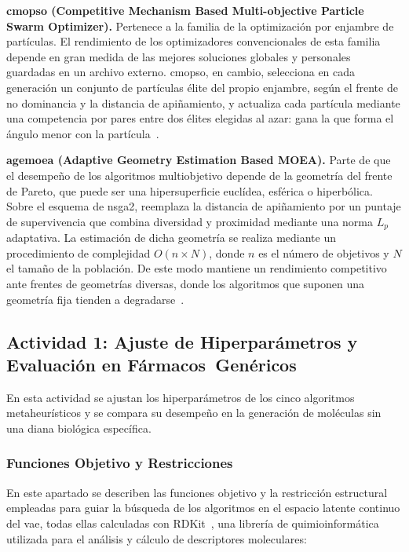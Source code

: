 \textbf{\acrshort{cmopso} (Competitive Mechanism Based Multi-objective Particle Swarm Optimizer).} Pertenece a la familia de la optimización por enjambre de partículas. El rendimiento de los optimizadores convencionales de esta familia depende en gran medida de las mejores soluciones globales y personales guardadas en un archivo externo. \acrshort{cmopso}, en cambio, selecciona en cada generación un conjunto de partículas élite del propio enjambre, según el frente de no dominancia y la distancia de apiñamiento, y actualiza cada partícula mediante una competencia por pares entre dos élites elegidas al azar: gana la que forma el ángulo menor con la partícula~\cite{zhang2018competitive}.

\textbf{\acrshort{agemoea} (Adaptive Geometry Estimation Based MOEA).} Parte de que el desempeño de los algoritmos multiobjetivo depende de la geometría del frente de Pareto, que puede ser una hipersuperficie euclídea, esférica o hiperbólica. Sobre el esquema de \acrshort{nsga2}, reemplaza la distancia de apiñamiento por un puntaje de supervivencia que combina diversidad y proximidad mediante una norma $L_p$ adaptativa. La estimación de dicha geometría se realiza mediante un procedimiento de complejidad $O(n \times N)$, donde $n$ es el número de objetivos y $N$ el tamaño de la población. De este modo mantiene un rendimiento competitivo ante frentes de geometrías diversas, donde los algoritmos que suponen una geometría fija tienden a degradarse~\cite{panichella2019adaptive}.

\subsection{Actividad 1: Ajuste de Hiperparámetros y Evaluación en Fármacos~Genéricos}
\label{sec:fase1_ajuste}
\label{sec:farmacos_genericos}
\label{sec:ajuste_hiperparametros}
\label{subsec:ajuste_metaheuristicas}

En esta actividad se ajustan los hiperparámetros de los cinco algoritmos metaheurísticos y se compara su desempeño en la generación de moléculas sin una diana biológica específica.

\subsubsection{Funciones Objetivo y Restricciones}
\label{subsec:fo_genericos}
\label{subsubsec:fo_genericos}

En este apartado se describen las funciones objetivo y la restricción estructural empleadas para guiar la búsqueda de los algoritmos en el espacio latente continuo del \gls{vae}, todas ellas calculadas con RDKit~\cite{landrum2026rdkit}, una librería de quimioinformática utilizada para el análisis y cálculo de descriptores moleculares:

